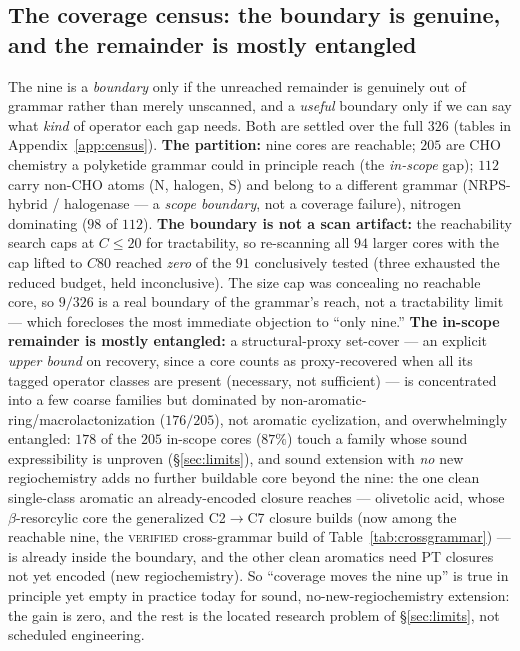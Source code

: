 \subsection{The coverage census: the boundary is genuine, and the remainder is mostly entangled}
\label{sec:census}
The nine is a \emph{boundary} only if the unreached remainder is genuinely out of grammar rather than
merely unscanned, and a \emph{useful} boundary only if we can say what \emph{kind} of operator each gap
needs. Both are settled over the full $326$ (tables in Appendix~\ref{app:census}). \textbf{The partition:}
nine cores are reachable; $205$ are CHO chemistry a polyketide grammar could in principle reach (the
\emph{in-scope} gap); $112$ carry non-CHO atoms (N, halogen, S) and belong to a different grammar
(NRPS-hybrid / halogenase --- a \emph{scope boundary}, not a coverage failure), nitrogen dominating
($98$ of $112$). \textbf{The boundary is not a scan artifact:} the reachability search caps at
$C{\le}20$ for tractability, so re-scanning all $94$ larger cores with the cap lifted to $C80$ reached
\emph{zero} of the $91$ conclusively tested (three exhausted the reduced budget, held inconclusive). The
size cap was concealing no reachable core, so $9/326$ is a real boundary of the grammar's reach, not a
tractability limit --- which forecloses the most immediate objection to ``only nine.'' \textbf{The
in-scope remainder is mostly entangled:} a structural-proxy set-cover --- an explicit \emph{upper bound}
on recovery, since a core counts as proxy-recovered when all its tagged operator classes are present
(necessary, not sufficient) --- is concentrated into a few coarse families but dominated by
non-aromatic-ring/macrolactonization ($176/205$), not aromatic cyclization, and overwhelmingly
entangled: $178$ of the $205$ in-scope cores ($87\%$) touch a family whose sound expressibility is
unproven (\S\ref{sec:limits}), and sound extension with \emph{no} new regiochemistry adds no further
buildable core beyond the nine: the one clean single-class aromatic an already-encoded closure reaches
--- olivetolic acid, whose $\beta$-resorcylic core the generalized C2$\to$C7 closure builds (now among
the reachable nine, the \textsc{verified} cross-grammar build of Table~\ref{tab:crossgrammar}) --- is
already inside the boundary, and the other clean aromatics need PT closures not yet encoded (new
regiochemistry). So ``coverage moves the nine up'' is true in principle yet empty in practice today for
sound, no-new-regiochemistry extension: the gain is zero, and the rest is the located research problem
of \S\ref{sec:limits}, not scheduled
engineering.

